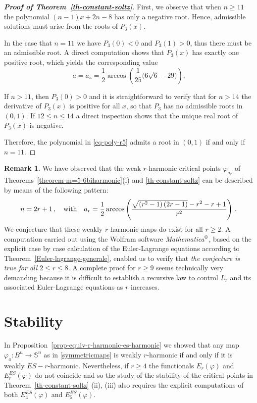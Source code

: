 \documentclass[11pt]{amsart}
\theoremstyle{plain}
\theoremstyle{definition}
\newtheorem{remark}       [theorem]  {Remark}
\numberwithin{equation}{section}
\def \s{{\mathbb S}}
\numberwithin{equation}{section}
\begin{document}
\begin{proof}[\textbf{Proof of Theorem~\ref{th-constant-soltz}}]
First, we observe that when $n\ge 11$ the polynomial $(n-1)x+2n-8$ has only a negative root. Hence, admissible solutions must arise from the roots of $P_3(x)$.

In the case that $n=11$ we have $P_3(0)<0$ and $P_3(1)>0$, thus there must be an admissible root. A direct computation shows that $P_3(x)$ has exactly one positive root, which yields the corresponding value
\[
a=a_5=\frac{1}{2}\arccos\!\left(\frac{1}{25}\bigl(6\sqrt{6}-29\bigr)\right).
\]

If $n>11$, then $P_3(0)>0$ and it is straightforward to verify that for $n>14$ the derivative of $P_3(x)$ is positive for all $x$, so that $P_3$ has no admissible roots in $(0,1)$. If $12 \leq n \leq 14$ a direct inspection shows that the unique real root of $P_3(x)$ is negative.

Therefore, the polynomial in \eqref{eq-poly-r5} admits a root in $(0,1)$ if and only if $n=11$.
\end{proof}

\begin{remark}\label{rem-conjecture}
We have observed that the weak $r$-harmonic critical points $\varphi_{a_r}$ of Theorems~\ref{theorem-m=5-6biharmonic}(i) and \ref{th-constant-soltz}  can be described by means of the following pattern:
\[
n=2 r +1\,, \quad {\rm with}\quad a_r=\frac{1}{2} \arccos \left(\frac{\sqrt{\left(r^2-1\right) (2 r-1)}-r^2-r+1}{r^2}\right)\,.
\]
We conjecture that these weakly $r$-harmonic maps do exist for all $r \geq 2$. A computation carried out using the Wolfram software \textit{Mathematica}${}^{ \text{\textregistered}} $, based on the explicit case by case calculation of the Euler-Lagrange equations according to Theorem~\ref{Euler-lagrange-generale}, enabled us to verify  that \textit{the conjecture is true for all }$2 \leq r \leq 8$. A complete proof for $r \geq 9$ seems technically very demanding because it is difficult to establish a recursive law to control $L_r$ and its associated Euler-Lagrange equations as $r$ increases.
\end{remark}

\section{Stability}\label{stability}

In Proposition~\ref{prop-equiv-r-harmonic-es-harmonic} we showed that any map $\varphi_a:B^n \to \s^n$  as in \eqref{symmetricmaps} is 
weakly $r$-harmonic if and only if it is weakly $ES-r$-harmonic. Nevertheless, if $r\geq 4$ the functionals $E_r(\varphi)$ and $E^{ES}_r(\varphi)$ do not coincide and so the study of the stability of the critical points in Theorem~\ref{th-constant-soltz} (ii), (iii) also requires the explicit computations of both $E^{ES}_4(\varphi)$ and $E^{ES}_5(\varphi)$. 
\end{document}
